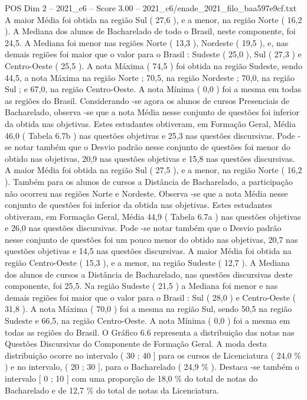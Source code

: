 \begin{textsample}{POS Dim 2 – 2021\_c6 – Score 3.00 – 2021\_c6/enade\_2021\_filo\_baa597e9cf.txt}
A maior Média foi obtida na região Sul ( 27,6 ), e a menor, na região Norte ( 16,2 ).
A Mediana dos alunos de Bacharelado de todo o Brasil, neste componente, foi 24,5.
A Mediana foi menor nas regiões Norte ( 13,3 ), Nordeste ( 19,5 ), e, nas demais regiões foi maior que o valor para o Brasil : Sudeste ( 25,0 ), Sul ( 27,3 ) e Centro-Oeste ( 25,5 ).
A nota Máxima ( 74,5 ) foi obtida na região Sudeste, sendo 44,5, a nota Máxima na região Norte ; 70,5, na região Nordeste ; 70,0, na região Sul ; e 67,0, na região Centro-Oeste.
A nota Mínima ( 0,0 ) foi a mesma em todas as regiões do Brasil.
Considerando -se agora os alunos de cursos Presenciais de Bacharelado, observa -se que a nota Média nesse conjunto de questões foi inferior da obtida nas objetivas.
Estes estudantes obtiveram, em Formação Geral, Média 46,0 ( Tabela 6.7b ) nas questões objetivas e 25,3 nas questões discursivas.
Pode -se notar também que o Desvio padrão nesse conjunto de questões foi menor do obtido nas objetivas, 20,9 nas questões objetivas e 15,8 nas questões discursivas.
A maior Média foi obtida na região Sul ( 27,5 ), e a menor, na região Norte ( 16,2 ).
Também para os alunos de cursos a Distância de Bacharelado, a participação não ocorreu nas regiões Norte e Nordeste.
Observa -se que a nota Média nesse conjunto de questões foi inferior da obtida nas objetivas.
Estes estudantes obtiveram, em Formação Geral, Média 44,9 ( Tabela 6.7a ) nas questões objetivas e 26,0 nas questões discursivas.
Pode -se notar também que o Desvio padrão nesse conjunto de questões foi um pouco menor do obtido nas objetivas, 20,7 nas questões objetivas e 14,5 nas questões discursivas.
A maior Média foi obtida na região Centro-Oeste ( 15,3 ), e a menor, na região Sudeste ( 12,7 ).
A Mediana dos alunos de cursos a Distância de Bacharelado, nas questões discursivas deste componente, foi 25,5.
Na região Sudeste ( 21,5 ) a Mediana foi menor e nas demais regiões foi maior que o valor para o Brasil : Sul ( 28,0 ) e Centro-Oeste ( 31,8 ).
A nota Máxima ( 70,0 ) foi a mesma na região Sul, sendo 50,5 na região Sudeste e 66,5, na região Centro-Oeste.
A nota Mínima ( 0,0 ) foi a mesma em todas as regiões do Brasil.
O Gráfico 6.6 representa a distribuição das notas nas Questões Discursivas do Componente de Formação Geral.
A moda desta distribuição ocorre no intervalo ( 30 ; 40 ] para os cursos de Licenciatura ( 24,0 \% ) e no intervalo, ( 20 ; 30 ], para o Bacharelado ( 24,9 \% ).
Destaca -se também o intervalo [ 0 ; 10 ] com uma proporção de 18,0 \% do total de notas do Bacharelado e de 12,7 \% do total de notas da Licenciatura.

\end{textsample}
